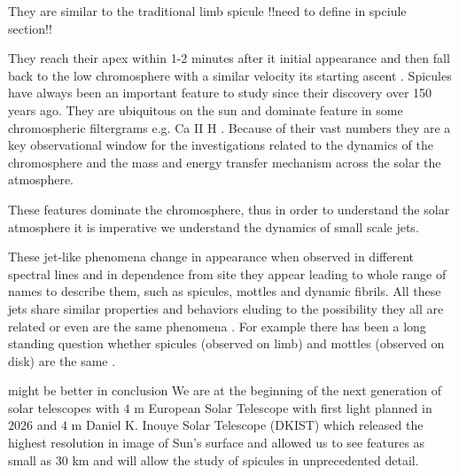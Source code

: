 \documentclass[12pt]{ociamthesis}
\newcommand{\np}{\\ \\}
\begin{document}
They are similar to the traditional limb spicule {\color{green} !!need to define in spciule section!!}

They reach their apex within 1-2 minutes after it initial appearance and then fall back to the low chromosphere with a similar velocity its starting ascent \citep{Tsiropoula2012}. Spicules have always been an important feature to study since their discovery over 150 years ago. They are ubiquitous on the sun and dominate feature in some chromospheric filtergrams e.g. Ca II H \cite{Pereira2016ApJ82465P}. Because of their vast numbers they are a key observational window for the investigations related to the dynamics of the chromosphere and the mass and energy transfer mechanism across the solar the atmosphere. %

These features dominate the chromosphere, thus in order to understand the solar atmosphere it is imperative we understand the dynamics of small scale jets.

These jet-like phenomena change in appearance when observed in different spectral lines and in dependence from site they appear leading to whole range of names to describe them, such as spicules, mottles and dynamic fibrils. All these jets share similar properties and behaviors eluding to the possibility they all are related or even are the same phenomena \citep{Porfir2016A}. For example there has been a long standing question whether spicules (observed on limb) and mottles (observed on disk) are the same \citep{Pontieu2007ASPC}.

{\color{green} might be better in conclusion} We are at the beginning of the next generation of solar telescopes with $4$ m European Solar Telescope with first light planned in $2026$ \citep{Matthews2016SPIE} and $4$ m Daniel K. Inouye Solar Telescope (DKIST) which released the highest resolution in image of Sun's surface and allowed us to see features as small as $30$ km and will allow the study of spicules in unprecedented detail.
\end{document}
